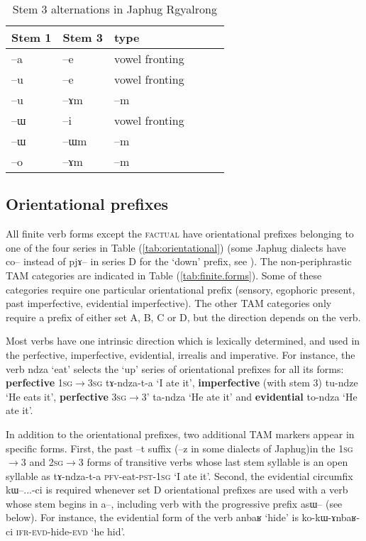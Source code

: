 \documentclass[oldfontcommands,oneside,a4paper,11pt]{article}
\newcommand{\ipa}[1]{{\phon#1}} %
\newcommand{\refb}[1]{(\ref{#1})}
\begin{document}
 \begin{table} 
\caption{Stem 3 alternations in Japhug Rgyalrong} \label{tab:stem3} \centering
\begin{tabular}{llllll}
\toprule
Stem 1 & Stem 3& type \\
\midrule
 \ipa{--a} & \ipa{--e} & vowel fronting\\
 \ipa{--u} & \ipa{--e} & vowel fronting\\
\ipa{--u} & \ipa{--ɤm} & \ipa{--m} \\
\ipa{--ɯ} & \ipa{--i} & vowel fronting\\
\ipa{--ɯ} & \ipa{--ɯm} & \ipa{--m}\\
\ipa{--o} & \ipa{--ɤm} & \ipa{--m} \\
\bottomrule
\end{tabular}
\end{table}




\subsection{Orientational prefixes}
All finite verb forms except the \textsc{factual} have orientational prefixes belonging to one of the four series in Table \refb{tab:orientational} (some Japhug dialects have \ipa{co--} instead of \ipa{pjɤ--} in series D for the `down' prefix, see \citealt{linluo03}). The non-periphrastic TAM categories are indicated in Table \refb{tab:finite.forms}. Some of these categories require one particular orientational prefix (sensory, egophoric present, past imperfective, evidential imperfective). The other TAM categories only require a prefix of either set A, B, C or D, but the direction depends on the verb.

Most verbs have one intrinsic direction which is lexically determined, and used in the perfective, imperfective, evidential, irrealis and imperative. For instance, the verb \ipa{ndza} `eat' selects the `up' series of orientational prefixes for all its forms: \textbf{perfective} \textsc{1sg$\rightarrow$3sg} \ipa{tɤ-ndza-t-a} `I ate it', \textbf{imperfective} (with stem 3) \ipa{tu-ndze} `He eats it', \textbf{perfective} \textsc{3sg$\rightarrow$3'} \ipa{ta-ndza} `He ate it' and \textbf{evidential} \ipa{to-ndza} `He ate it'. 

In addition to the orientational prefixes, two additional TAM markers appear in specific forms. First, the past \ipa{--t} suffix (\ipa{--z} in some dialects of Japhug)in the \textsc{1sg}$\rightarrow$3 and \textsc{2sg}$\rightarrow$3 forms of transitive verbs whose last stem syllable is an open syllable as \ipa{tɤ-ndza-t-a} \textsc{pfv}-eat-\textsc{pst-1sg} `I ate it'. Second, the evidential circumfix \ipa{kɯ--...-ci} is required whenever set D orientational prefixes are used with a verb whose stem begins in \ipa{a--}, including verb with the progressive prefix \ipa{asɯ--} (see below). For instance, the evidential form of the verb \ipa{anbaʁ} `hide' is \ipa{ko-kɯ-ɤnbaʁ-ci} \textsc{ifr-evd}-hide-\textsc{evd} `he hid'.
\end{document}
